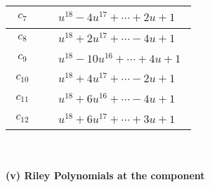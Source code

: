\documentclass[1p]{elsarticle_modified}
\theoremstyle{definition}
\begin{document}
\begin{tabular}{m{50pt}|m{274pt}}
\hline $$\begin{aligned}c_{7}\end{aligned}$$&$\begin{aligned}
&u^{18}-4 u^{17}+\cdots+2 u+1
\end{aligned}$\\
\hline $$\begin{aligned}c_{8}\end{aligned}$$&$\begin{aligned}
&u^{18}+2 u^{17}+\cdots-4 u+1
\end{aligned}$\\
\hline $$\begin{aligned}c_{9}\end{aligned}$$&$\begin{aligned}
&u^{18}-10 u^{16}+\cdots+4 u+1
\end{aligned}$\\
\hline $$\begin{aligned}c_{10}\end{aligned}$$&$\begin{aligned}
&u^{18}+4 u^{17}+\cdots-2 u+1
\end{aligned}$\\
\hline $$\begin{aligned}c_{11}\end{aligned}$$&$\begin{aligned}
&u^{18}+6 u^{16}+\cdots-4 u+1
\end{aligned}$\\
\hline $$\begin{aligned}c_{12}\end{aligned}$$&$\begin{aligned}
&u^{18}+6 u^{17}+\cdots+3 u+1
\end{aligned}$\\
\hline
\end{tabular}\\~\\
\newpage\renewcommand{\arraystretch}{1}
\flushleft \textbf{(v) Riley Polynomials at the component}\newline \\
\end{document}
